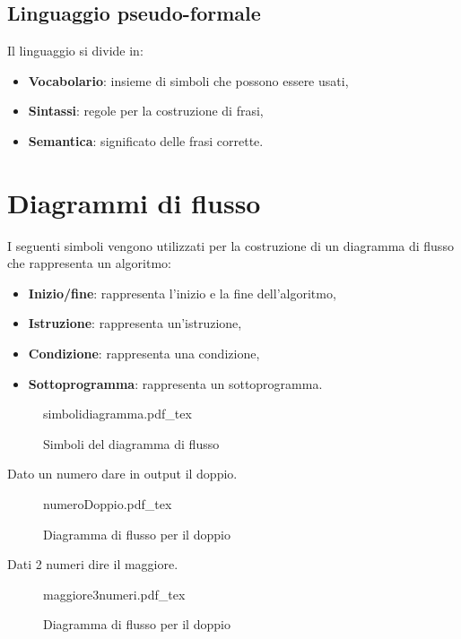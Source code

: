 \documentclass[a4paper]{article}
\theoremstyle{break}
\theoremstyle{break}
\theoremstyle{break}
\theoremstyle{break}
\newcommand{\incfig}[2][1]{%
	\def\svgwidth{#1\columnwidth}
	{#2.pdf_tex}
}
\begin{document}
\subsection{Linguaggio pseudo-formale}
Il linguaggio si divide in:
\begin{itemize}
	\item \textbf{Vocabolario}: insieme di simboli che possono essere usati,
	\item \textbf{Sintassi}: regole per la costruzione di frasi,
	\item \textbf{Semantica}: significato delle frasi corrette.
\end{itemize}

\section{Diagrammi di flusso}
I seguenti simboli vengono utilizzati per la costruzione di un diagramma
di flusso che rappresenta un algoritmo:
\begin{itemize}
	\item \textbf{Inizio/fine}: rappresenta l'inizio e la fine dell'algoritmo,
	\item \textbf{Istruzione}: rappresenta un'istruzione,
	\item \textbf{Condizione}: rappresenta una condizione,
	\item \textbf{Sottoprogramma}: rappresenta un sottoprogramma.
\end{itemize}

\begin{figure}[ht]
	\centering
	\incfig[0.3]{simbolidiagramma}
	\caption{Simboli del diagramma di flusso}
	\label{fig:simbolidiagramma}
\end{figure}

Dato un numero dare in output il doppio.
\begin{figure}[ht]
	\centering
	\incfig[0.3]{numeroDoppio}
	\caption{Diagramma di flusso per il doppio}
	\label{fig:doppio}
\end{figure}

Dati 2 numeri dire il maggiore.
\begin{figure}[ht]
	\centering
	\incfig[0.3]{maggiore3numeri}
	\caption{Diagramma di flusso per il doppio}
	\label{fig:maggiore3numeri}
\end{figure}
\end{document}
